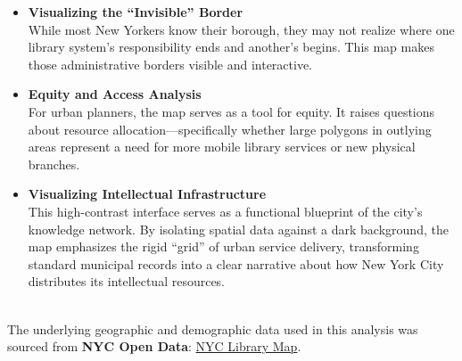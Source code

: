 \documentclass[11pt]{article}
\begin{document}
	\vspace{5mm}
	\begin{itemize}
		\item \textbf{Visualizing the ``Invisible'' Border} \\
		While most New Yorkers know their borough, they may not realize where one library system's responsibility ends and another's begins. This map makes those administrative borders visible and interactive.
		
		\item  \textbf{Equity and Access Analysis} \\
		For urban planners, the map serves as a tool for equity. It raises questions about resource allocation---specifically whether large polygons in outlying areas represent a need for more mobile library services or new physical branches.
		
	 	\item  \textbf{Visualizing Intellectual Infrastructure} \\
		This high-contrast interface serves as a functional blueprint of the city's knowledge network. By isolating spatial data against a dark background, the map emphasizes the rigid ``grid'' of urban service delivery, transforming standard municipal records into a clear narrative about how New York City distributes its intellectual resources.
	\end{itemize}
	
	\vspace{5mm}
	 \\
	The underlying geographic and demographic data used in this analysis was sourced from \newline 
	\textbf{NYC Open Data}: 
	\href{https://data.cityofnewyork.us/Business/Library/p4pf-fyc4}{NYC Library Map}.
	
\end{document}
